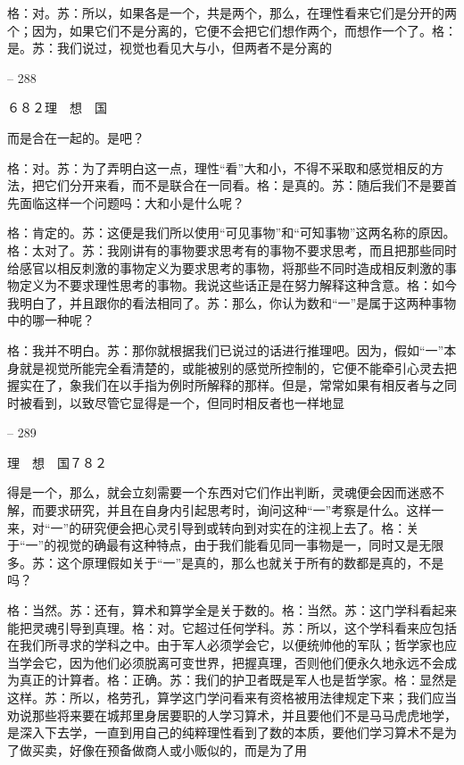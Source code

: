 \documentclass[11pt,oneside]{book}
\begin{document}
\begin{common-format}
    格：对。苏：所以，如果各是一个，共是两个，那么，在理性看来它们是分开的两个；因为，如果它们不是分离的，它便不会把它们想作两个，而想作一个了。格：是。苏：我们说过，视觉也看见大与小，但两者不是分离的

    

-- 288

    ６８２理　想　国

    而是合在一起的。是吧？

    格：对。苏：为了弄明白这一点，理性“看”大和小，不得不采取和感觉相反的方法，把它们分开来看，而不是联合在一同看。格：是真的。苏：随后我们不是要首先面临这样一个问题吗：大和小是什么呢？

    格：肯定的。苏：这便是我们所以使用“可见事物”和“可知事物”这两名称的原因。格：太对了。苏：我刚讲有的事物要求思考有的事物不要求思考，而且把那些同时给感官以相反刺激的事物定义为要求思考的事物，将那些不同时造成相反刺激的事物定义为不要求理性思考的事物。我说这些话正是在努力解释这种含意。格：如今我明白了，并且跟你的看法相同了。苏：那么，你认为数和“一”是属于这两种事物中的哪一种呢？

    格：我并不明白。苏：那你就根据我们已说过的话进行推理吧。因为，假如“一”本身就是视觉所能完全看清楚的，或能被别的感觉所控制的，它便不能牵引心灵去把握实在了，象我们在以手指为例时所解释的那样。但是，常常如果有相反者与之同时被看到，以致尽管它显得是一个，但同时相反者也一样地显

    

-- 289

    理　想　国７８２

    得是一个，那么，就会立刻需要一个东西对它们作出判断，灵魂便会因而迷惑不解，而要求研究，并且在自身内引起思考时，询问这种“一”考察是什么。这样一来，对“一”的研究便会把心灵引导到或转向到对实在的注视上去了。格：关于“一”的视觉的确最有这种特点，由于我们能看见同一事物是一，同时又是无限多。苏：这个原理假如关于“一”是真的，那么也就关于所有的数都是真的，不是吗？

    格：当然。苏：还有，算术和算学全是关于数的。格：当然。苏：这门学科看起来能把灵魂引导到真理。格：对。它超过任何学科。苏：所以，这个学科看来应包括在我们所寻求的学科之中。由于军人必须学会它，以便统帅他的军队；哲学家也应当学会它，因为他们必须脱离可变世界，把握真理，否则他们便永久地永远不会成为真正的计算者。格：正确。苏：我们的护卫者既是军人也是哲学家。格：显然是这样。苏：所以，格劳孔，算学这门学问看来有资格被用法律规定下来；我们应当劝说那些将来要在城邦里身居要职的人学习算术，并且要他们不是马马虎虎地学，是深入下去学，一直到用自己的纯粹理性看到了数的本质，要他们学习算术不是为了做买卖，好像在预备做商人或小贩似的，而是为了用


\end{common-format}
\end{document}
